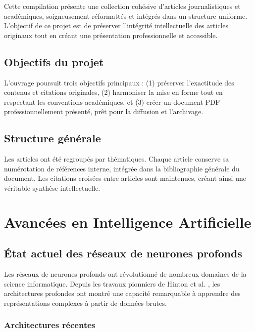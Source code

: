 \documentclass[12pt,a4paper,twoside,openright,openany]{book}
\begin{document}
	Cette compilation présente une collection cohésive d'articles journalistiques et académiques, soigneusement réformattés et intégrés dans un structure uniforme. L'objectif de ce projet est de préserver l'intégrité intellectuelle des articles originaux tout en créant une présentation professionnelle et accessible.
	
	\section*{Objectifs du projet}
	
	L'ouvrage poursuit trois objectifs principaux : (1) préserver l'exactitude des contenus et citations originales, (2) harmoniser la mise en forme tout en respectant les conventions académiques, et (3) créer un document PDF professionnellement présenté, prêt pour la diffusion et l'archivage.
	
	\section*{Structure générale}
	
	Les articles ont été regroupés par thématiques. Chaque article conserve sa numérotation de références interne, intégrée dans la bibliographie générale du document. Les citations croisées entre articles sont maintenues, créant ainsi une véritable synthèse intellectuelle.
	
	\newpage
	
	\chapter{Avancées en Intelligence Artificielle}
	\label{ch:ia}
	
	\section{État actuel des réseaux de neurones profonds}
	
	Les réseaux de neurones profonds \cite{LeCun2015} ont révolutionné de nombreux domaines de la science informatique. Depuis les travaux pionniers de Hinton et al. \cite{Hinton2006}, les architectures profondes ont montré une capacité remarquable à apprendre des représentations complexes à partir de données brutes.
	
	\subsection{Architectures récentes}
	
\end{document}

